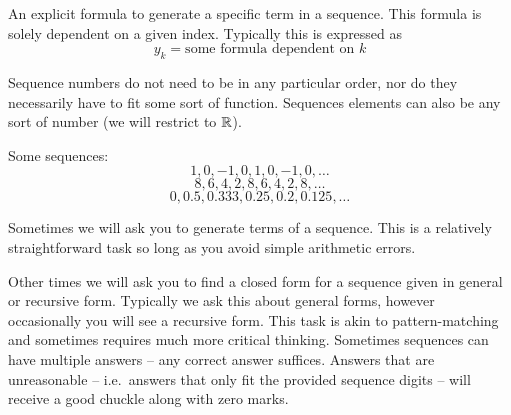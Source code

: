 \documentclass[main.tex]{subfiles}
\begin{document}
\begin{defn}
	An explicit formula to generate a specific term in a sequence. This formula is solely dependent on a given index. Typically this is expressed as \[y_k = \text{some formula dependent on } k\]
\end{defn}

\begin{rem}
	Sequence numbers do not need to be in any particular order, nor do they necessarily have to fit some sort of function. Sequences elements can also be any sort of number (we will restrict to \(\mathbb{R}\)).
\end{rem}

\begin{example}
	Some sequences:
	\[1, 0, -1, 0, 1, 0, -1, 0, \dots\]
	\[8, 6, 4, 2, 8, 6, 4, 2, 8, \dots\]
	\[0, 0.5, 0.333, 0.25, 0.2, 0.125, \dots\]
\end{example}

Sometimes we will ask you to generate terms of a sequence. This is a relatively straightforward task so long as you avoid simple arithmetic errors. 


Other times we will ask you to find a closed form for a sequence given in general or recursive form. Typically we ask this about general forms, however occasionally you will see a recursive form. This task is akin to pattern-matching and sometimes requires much more critical thinking. Sometimes sequences can have multiple answers -- any correct answer suffices. Answers that are unreasonable -- i.e.\ answers that only fit the provided sequence digits -- will receive a good chuckle along with zero marks.
\end{document}
